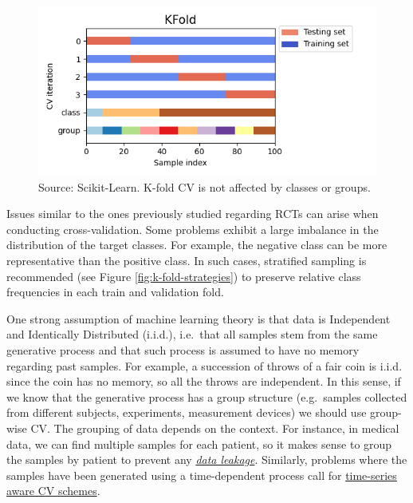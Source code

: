 \documentclass[
]{book}
\begin{document}
\begin{figure}

{\centering \includegraphics[width=0.63\linewidth]{Figures/k-fold-vis} 

}

\caption{Source: Scikit-Learn. K-fold CV is not affected by classes or groups.}\label{fig:k-fold-vis}
\end{figure}

Issues similar to the ones previously studied regarding RCTs can arise when conducting cross-validation. Some problems exhibit a large imbalance in the distribution of the target classes. For example, the negative class can be more representative than the positive class. In such cases, stratified sampling is recommended (see Figure \ref{fig:k-fold-strategies}) to preserve relative class frequencies in each train and validation fold.

One strong assumption of machine learning theory is that data is Independent and Identically Distributed (i.i.d.), i.e.~that all samples stem from the same generative process and that such process is assumed to have no memory regarding past samples. For example, a succession of throws of a fair coin is i.i.d. since the coin has no memory, so all the throws are independent. In this sense, if we know that the generative process has a group structure (e.g.~samples collected from different subjects, experiments, measurement devices) we should use group-wise CV. The grouping of data depends on the context. For instance, in medical data, we can find multiple samples for each patient, so it makes sense to group the samples by patient to prevent any \href{https://scikit-learn.org/0.24/common_pitfalls.html\#data-leakage}{\emph{data leakage}}. Similarly, problems where the samples have been generated using a time-dependent process call for \href{https://scikit-learn.org/stable/modules/cross_validation.html\#timeseries-cv}{time-series aware CV schemes}.
\end{document}
